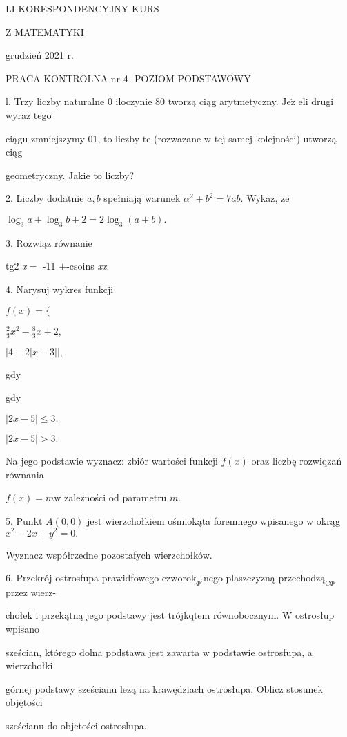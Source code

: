 \documentclass[a4paper,12pt]{article}
\begin{document}
LI KORESPONDENCYJNY KURS

Z MATEMATYKI

grudzień 2021 r.

PRACA KONTROLNA nr 4- POZIOM PODSTAWOWY

l. Trzy liczby naturalne $0$ iloczynie 80 tworzą ciąg arytmetyczny. $\mathrm{J}\mathrm{e}\dot{\mathrm{z}}$ eli drugi wyraz tego

ciągu zmniejszymy $0 1$, to liczby te (rozwazane $\mathrm{w}$ tej samej kolejności) utworzą ciąg

geometryczny. Jakie to liczby?

2. Liczby dodatnie $a, b$ spełniają warunek $\alpha^{2}+b^{2}=7ab$. Wykaz, $\dot{\mathrm{z}}\mathrm{e}$

$\log_{3}a+\log_{3}b+2=2\log_{3}(a+b).$

3. Rozwiąz równanie

tg2 {\it x}$=$ -11 $+$-csoins {\it xx}.

4. Narysuj wykres funkcji

$f(x)=\{$

$\displaystyle \frac{2}{3}x^{2}-\frac{8}{3}x+2,$

$|4-2|x-3||,$

gdy

gdy

$|2x-5|\leq 3,$

$|2x-5|>3.$

Na jego podstawie wyznacz: zbiór wartości funkcji $f(x)$ oraz liczbę rozwiqzań równania

$f(x)=m \mathrm{w}$ zalezności od parametru $m.$

5. Punkt $A(0,0)$ jest wierzchołkiem ośmiokąta foremnego wpisanego $\mathrm{w}$ okrąg $x^{2}-2x+y^{2}=0.$

Wyznacz współrzedne pozostafych wierzchołków.

6. Przekrój ostrosfupa prawidfowego $\mathrm{c}\mathrm{z}\mathrm{w}\mathrm{o}\mathrm{r}\mathrm{o}\mathrm{k}_{\Phi^{\mathrm{t}}}$nego plaszczyzną $\mathrm{p}\mathrm{r}\mathrm{z}\mathrm{e}\mathrm{c}\mathrm{h}\mathrm{o}\mathrm{d}\mathrm{z}\text{ą}_{\mathrm{C}\Phi}$ przez wierz-

chołek $\mathrm{i}$ przekątną jego podstawy jest trójkqtem równobocznym. $\mathrm{W}$ ostrosłup wpisano

sześcian, którego dolna podstawa jest zawarta $\mathrm{w}$ podstawie ostrosfupa, a wierzchołki

górnej podstawy sześcianu lezą na krawędziach ostrosłupa. Oblicz stosunek objętości

sześcianu do objetości ostroslupa.
\end{document}

